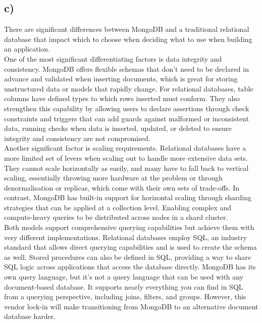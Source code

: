 \documentclass{article}
\begin{document}
\pagebreak

\subsection*{\small c)}

There are significant differences between MongoDB and a traditional relational database that impact which to choose when deciding what to use when building an application.\\
\newline
One of the most significant differentiating factors is data integrity and consistency. MongoDB offers flexible schemas that don't need to be declared in advance and validated when inserting documents, which is great for storing unstructured data or models that rapidly change. For relational databases, table columns have defined types to which rows inserted must conform. They also strengthen this capability by allowing users to declare assertions through check constraints and triggers that can add guards against malformed or inconsistent data, running checks when data is inserted, updated, or deleted to ensure integrity and consistency are not compromised. \\
\newline
Another significant factor is scaling requirements. Relational databases have a more limited set of levers when scaling out to handle more extensive data sets. They cannot scale horizontally as easily, and many have to fall back to vertical scaling, essentially throwing more hardware at the problem or through denormalisation or replicas, which come with their own sets of trade-offs. In contrast, MongoDB has built-in support for horizontal scaling through sharding strategies that can be applied at a collection level. Enabling complex and compute-heavy queries to be distributed across nodes in a shard cluster. \\
\newline
Both models support comprehensive querying capabilities but achieve them with very different implementations. Relational databases employ SQL, an industry standard that allows direct querying capabilities and is used to create the schema as well. Stored procedures can also be defined in SQL, providing a way to share SQL logic across applications that access the database directly. MongoDB has its own query language, but it's not a query language that can be used with any document-based database. It supports nearly everything you can find in SQL from a querying perspective, including joins, filters, and groups. However, this vendor lock-in will make transitioning from MongoDB to an alternative document database harder. \\
\end{document}
